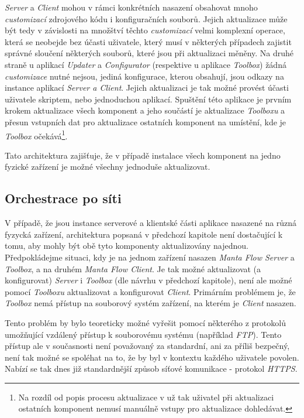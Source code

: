 \textit{Server} a \textit{Client} mohou v rámci konkrétních nasazení obsahovat mnoho \textit{customizací} zdrojového kódu i konfiguračních souborů. Jejich aktualizace může být tedy v závislosti na množštví těchto \textit{customizací} velmi komplexní operace, která se neobejde bez účasti uživatele, který musí v některých případech zajistit správné sloučení některých souborů, které jsou při aktualizaci měněny. Na druhé straně u aplikací \textit{Updater} a \textit{Configurator} (respektive u aplikace \textit{Toolbox}) žádná \textit{customizace} nutné nejsou, jediná konfigurace, kterou obsahují, jsou odkazy na instance aplikací \textit{Server a Client}. Jejich aktualizaci je tak možné provést účasti uživatele skriptem, nebo jednoduchou aplikací. Spuštění této aplikace je prvním krokem aktualizace všech komponent a jeho součástí je aktualizace \textit{Toolboxu} a přesun vstupních dat pro aktualizace ostatních komponent na umístění, kde je \textit{Toolbox} očekává\footnote{Na rozdíl od popis procesu aktualizace v \cite{Gondek16} už tak uživatel při aktualizaci ostatních komponent nemusí manuálně vstupy pro aktualizace dohledávat.}.

Tato architektura zajišťuje, že v případě instalace všech komponent na jedno fyzické zařízení je možné všechny jednoduše aktualizovat.

\subsection{Orchestrace po síti}
\label{sec:des_orchestration_multinode}
V případě, že jsou instance serverové a klientské části aplikace nasazené na různá fyzycká zařízení, architektura popsaná v předchozí kapitole není dostačující k tomu, aby mohly být obě tyto komponenty aktualizovány najednou.
Předpokládejme situaci, kdy je na jednom zařízení nasazen \textit{Manta Flow Server} a \textit{Toolbox}, a na druhém \textit{Manta Flow Client}. Je tak možné aktualizovat (a konfigurovat) \textit{Server} i \textit{Toolbox} (dle návrhu v předchozí kapitole), není ale možné pomocí \textit{Toolboxu} aktualizovat a konfigurovat \textit{Client}. Primárním problémem je, že \textit{Toolbox} nemá přístup na souborový systém zařízení, na kterém je \textit{Client} nasazen.

Tento problém by bylo teoreticky možné vyřešit pomocí některého z protokolů umožňující vzdálený přístup k souborovému systému (například \textit{FTP}). Tento přístup ale v současnosti není považovaný za standardní, ani za příliš bezpečný, není tak možné se spoléhat na to, že by byl v kontextu každého uživatele povolen. Nabízí se tak dnes již standardnější způsob síťové komunikace - protokol \textit{HTTPS}.

